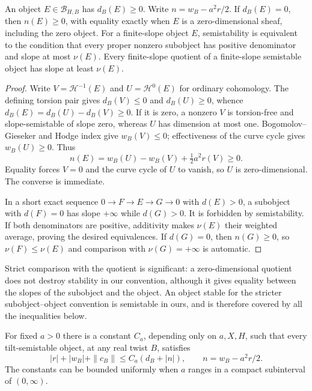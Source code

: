 \begin{lemma}\label{lem:tilt-zero-denominator}
An object $E\in\mathcal B_{H,B}$ has $d_B(E)\ge0$.
Write $n=w_B-a^2r/2$.
If $d_B(E)=0$, then $n(E)\ge0$, with equality exactly when
$E$ is a zero-dimensional sheaf, including the zero object.
For a finite-slope object $E$, semistability is equivalent to the
condition that every proper nonzero subobject has positive denominator
and slope at most $\nu(E)$.  Every finite-slope quotient of a
finite-slope semistable object has slope at least $\nu(E)$.
\end{lemma}

\begin{proof}
Write $V=\mathcal H^{-1}(E)$ and $U=\mathcal H^0(E)$ for ordinary
cohomology.  The defining torsion pair gives $d_B(V)\le0$ and
$d_B(U)\ge0$, whence $d_B(E)=d_B(U)-d_B(V)\ge0$.
If it is zero, a nonzero $V$ is torsion-free and slope-semistable of
slope zero, whereas $U$ has dimension at most one.  Bogomolov--Gieseker
and Hodge index give $w_B(V)\le0$; effectiveness of the curve cycle
gives $w_B(U)\ge0$.  Thus
\[
 n(E)=w_B(U)-w_B(V)+\tfrac12a^2r(V)\ge0.
\]
Equality forces $V=0$ and the curve cycle of $U$ to vanish, so $U$ is
zero-dimensional.  The converse is immediate.

In a short exact sequence $0\to F\to E\to G\to0$ with $d(E)>0$,
a subobject with $d(F)=0$ has slope $+\infty$ while $d(G)>0$.
It is forbidden by semistability.  If both denominators are positive,
additivity makes $\nu(E)$ their weighted average, proving the desired
equivalences.  If $d(G)=0$, then $n(G)\ge0$, so
$\nu(F)\le\nu(E)$ and comparison with $\nu(G)=+\infty$ is automatic.
\end{proof}

Strict comparison with the quotient is significant: a zero-dimensional
quotient does not destroy stability in our convention, although it
gives equality between the slopes of the subobject and the object.
An object stable for the stricter subobject--object convention is
semistable in ours, and is therefore covered by all the inequalities
below.

\begin{lemma}\label{lem:tilt-support-bound}
For fixed $a>0$ there is a constant $C_a$, depending only on $a,X,H$,
such that every tilt-semistable object, at any real twist $B$, satisfies
\begin{equation}\label{eq:tilt-support-bound}
 |r|+|w_B|+\|c_B\|\le C_a(d_B+|n|),\qquad n=w_B-a^2r/2.
\end{equation}
The constants can be bounded uniformly when $a$ ranges in a compact
subinterval of $(0,\infty)$.
\end{lemma}

